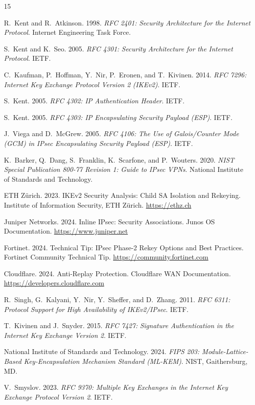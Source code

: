 \documentclass[sigconf,nonacm]{acmart}
\begin{document}
\sloppy

\begin{thebibliography}{15}

R.~Kent and R.~Atkinson. 1998. \textit{RFC 2401: Security Architecture for the Internet
Protocol}. Internet Engineering Task Force.

S.~Kent and K.~Seo. 2005. \textit{RFC 4301: Security Architecture for the Internet
Protocol}. IETF.

C.~Kaufman, P.~Hoffman, Y.~Nir, P.~Eronen, and T.~Kivinen. 2014.
\textit{RFC 7296: Internet Key Exchange Protocol Version 2 (IKEv2)}. IETF.

S.~Kent. 2005. \textit{RFC 4302: IP Authentication Header}. IETF.

S.~Kent. 2005. \textit{RFC 4303: IP Encapsulating Security Payload (ESP)}. IETF.

J.~Viega and D.~McGrew. 2005. \textit{RFC 4106: The Use of Galois/Counter Mode (GCM)
in IPsec Encapsulating Security Payload (ESP)}. IETF.

K.~Barker, Q.~Dang, S.~Franklin, K.~Scarfone, and P.~Wouters. 2020.
\textit{NIST Special Publication 800-77 Revision 1: Guide to IPsec VPNs}. National
Institute of Standards and Technology.

ETH Zürich. 2023. IKEv2 Security Analysis: Child SA Isolation and Rekeying.
Institute of Information Security, ETH Zürich.
\url{https://ethz.ch}

Juniper Networks. 2024. Inline IPsec: Security Associations. Junos OS Documentation.
\url{https://www.juniper.net}

Fortinet. 2024. Technical Tip: IPsec Phase-2 Rekey Options and Best Practices.
Fortinet Community Technical Tip.
\url{https://community.fortinet.com}

Cloudflare. 2024. Anti-Replay Protection. Cloudflare WAN Documentation.
\url{https://developers.cloudflare.com}

R.~Singh, G.~Kalyani, Y.~Nir, Y.~Sheffer, and D.~Zhang. 2011.
\textit{RFC 6311: Protocol Support for High Availability of IKEv2/IPsec}. IETF.

T.~Kivinen and J.~Snyder. 2015.
\textit{RFC 7427: Signature Authentication in the Internet Key Exchange Version 2}.
IETF.

National Institute of Standards and Technology. 2024.
\textit{FIPS 203: Module-Lattice-Based Key-Encapsulation Mechanism Standard (ML-KEM)}.
NIST, Gaithersburg, MD.

V.~Smyslov. 2023.
\textit{RFC 9370: Multiple Key Exchanges in the Internet Key Exchange Protocol Version 2}.
IETF.

\end{thebibliography}
\end{document}
